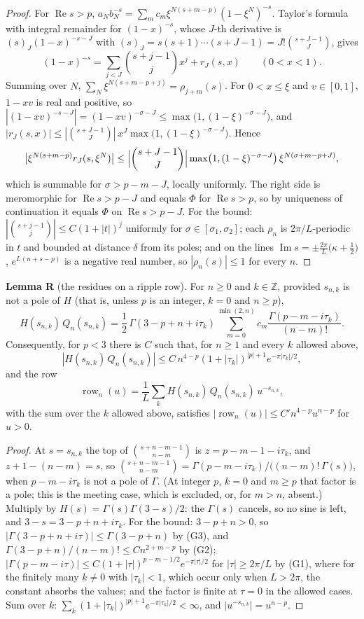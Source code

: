 \documentclass[11pt]{article}
\newcommand{\re}{\operatorname{Re}}
\newcommand{\im}{\operatorname{Im}}
\newcommand{\row}{\operatorname{row}}
\begin{document}
\begin{proof}
For $\re s>p$, $a_Nb_N^{-s}=\sum_mc_m\xi^{N(s+m-p)}(1-\xi^N)^{-s}$. Taylor's formula with integral remainder for $(1-x)^{-s}$, whose $J$-th derivative is $(s)_J(1-x)^{-s-J}$ with $(s)_J=s(s+1)\cdots(s+J-1)=J!\binom{s+J-1}{J}$, gives
\[
(1-x)^{-s}=\sum_{j<J}\binom{s+j-1}{j}x^j+r_J(s,x)\qquad(0<x<1).
\]
Summing over $N$, $\sum_N\xi^{N(s+m-p+j)}=\rho_{j+m}(s)$. For $0<x\le\xi$ and $v\in[0,1]$, $1-xv$ is real and positive, so $|(1-xv)^{-s-J}|=(1-xv)^{-\sigma-J}\le\max\bigl(1,(1-\xi)^{-\sigma-J}\bigr)$, and $|r_J(s,x)|\le|\binom{s+J-1}{J}|\,x^J\max\bigl(1,(1-\xi)^{-\sigma-J}\bigr)$. Hence
\[
\bigl|\xi^{N(s+m-p)}r_J(s,\xi^N)\bigr|\le\Bigl|\binom{s+J-1}{J}\Bigr|\max\bigl(1,(1-\xi)^{-\sigma-J}\bigr)\,\xi^{N(\sigma+m-p+J)},
\]
which is summable for $\sigma>p-m-J$, locally uniformly. The right side is meromorphic for $\re s>p-J$ and equals $\Phi$ for $\re s>p$, so by uniqueness of continuation it equals $\Phi$ on $\re s>p-J$. For the bound: $|\binom{s+j-1}{j}|\le C(1+|t|)^j$ uniformly for $\sigma\in[\sigma_1,\sigma_2]$; each $\rho_n$ is $2\pi/L$-periodic in $t$ and bounded at distance $\delta$ from its poles; and on the lines $\im s=\pm\frac{2\pi}{L}\bigl(\kappa+\frac12\bigr)$, $e^{L(n+s-p)}$ is a negative real number, so $|\rho_n(s)|\le1$ for every $n$.
\end{proof}

\noindent\textbf{Lemma R} (the residues on a ripple row). For $n\ge0$ and $k\in\mathbb{Z}$, provided $s_{n,k}$ is not a pole of $H$ (that is, unless $p$ is an integer, $k=0$ and $n\ge p$),
\begin{equation*}
H(s_{n,k})\,Q_n(s_{n,k})=\frac12\,\Gamma(3-p+n+i\tau_k)\sum_{m=0}^{\min(2,n)}c_m\frac{\Gamma(p-m-i\tau_k)}{(n-m)!}. \tag{R}
\end{equation*}
Consequently, for $p<3$ there is $C$ such that, for $n\ge1$ and every $k$ allowed above,
\[
|H(s_{n,k})\,Q_n(s_{n,k})|\le C\,n^{4-p}(1+|\tau_k|)^{|p|+1}e^{-\pi|\tau_k|/2},
\]
and the row
\[
\row_n(u)=\frac1L\sum_kH(s_{n,k})\,Q_n(s_{n,k})\,u^{-s_{n,k}},
\]
with the sum over the $k$ allowed above, satisfies $|\row_n(u)|\le C'n^{4-p}u^{n-p}$ for $u>0$.

\begin{proof}
At $s=s_{n,k}$ the top of $\binom{s+n-m-1}{n-m}$ is $z=p-m-1-i\tau_k$, and $z+1-(n-m)=s$, so $\binom{s+n-m-1}{n-m}=\Gamma(p-m-i\tau_k)/\bigl((n-m)!\,\Gamma(s)\bigr)$, when $p-m-i\tau_k$ is not a pole of $\Gamma$. (At integer $p$, $k=0$ and $m\ge p$ that factor is a pole; this is the meeting case, which is excluded, or, for $m>n$, absent.) Multiply by $H(s)=\Gamma(s)\Gamma(3-s)/2$: the $\Gamma(s)$ cancels, so no sine is left, and $3-s=3-p+n+i\tau_k$. For the bound: $3-p+n>0$, so $|\Gamma(3-p+n+i\tau)|\le\Gamma(3-p+n)$ by (G3), and $\Gamma(3-p+n)/(n-m)!\le Cn^{2+m-p}$ by (G2); $|\Gamma(p-m-i\tau)|\le C(1+|\tau|)^{p-m-1/2}e^{-\pi|\tau|/2}$ for $|\tau|\ge2\pi/L$ by (G1), where for the finitely many $k\ne0$ with $|\tau_k|<1$, which occur only when $L>2\pi$, the constant absorbs the values; and the factor is finite at $\tau=0$ in the allowed cases. Sum over $k$: $\sum_k(1+|\tau_k|)^{|p|+1}e^{-\pi|\tau_k|/2}<\infty$, and $|u^{-s_{n,k}}|=u^{n-p}$.
\end{proof}
\end{document}

